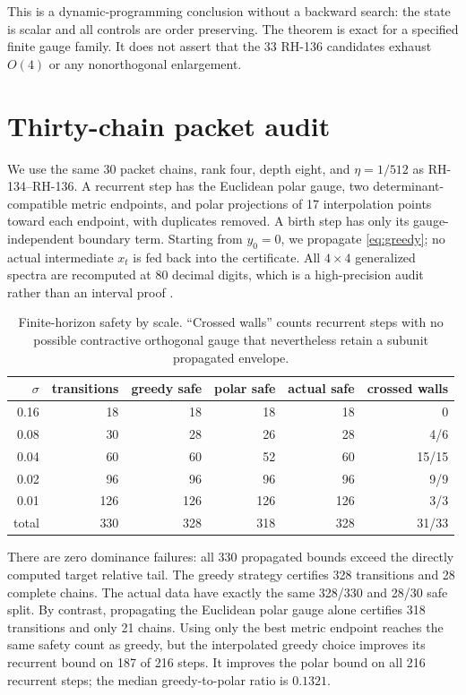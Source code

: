 \documentclass[12pt]{article}
\begin{document}
This is a dynamic-programming conclusion without a backward search: the
state is scalar and all controls are order preserving.  The theorem is exact
for a specified finite gauge family.  It does not assert that the 33 RH-136
candidates exhaust $O(4)$ or any nonorthogonal enlargement.

\section{Thirty-chain packet audit}
We use the same 30 packet chains, rank four, depth eight, and
$\eta=1/512$ as RH-134--RH-136.  A recurrent step has the Euclidean polar
gauge, two determinant-compatible metric endpoints, and polar projections of
17 interpolation points toward each endpoint, with duplicates removed.  A
birth step has only its gauge-independent boundary term.  Starting from
$y_0=0$, we propagate \eqref{eq:greedy}; no actual intermediate $x_t$ is fed
back into the certificate.  All $4\times4$ generalized spectra are
recomputed at 80 decimal digits, which is a high-precision audit rather than
an interval proof \citep{Higham2002}.

\begin{table}[t]
\centering
\begin{tabular}{rrrrrr}
\toprule
$\sigma$ & transitions & greedy safe & polar safe & actual safe & crossed walls \\
\midrule
0.16 & 18  & 18  & 18  & 18  & 0 \\
0.08 & 30  & 28  & 26  & 28  & 4/6 \\
0.04 & 60  & 60  & 52  & 60  & 15/15 \\
0.02 & 96  & 96  & 96  & 96  & 9/9 \\
0.01 & 126 & 126 & 126 & 126 & 3/3 \\
\midrule
total & 330 & 328 & 318 & 328 & 31/33 \\
\bottomrule
\end{tabular}
\caption{Finite-horizon safety by scale.  ``Crossed walls'' counts recurrent
steps with no possible contractive orthogonal gauge that nevertheless retain
a subunit propagated envelope.}
\label{tab:audit}
\end{table}

There are zero dominance failures: all 330 propagated bounds exceed the
directly computed target relative tail.  The greedy strategy certifies 328
transitions and 28 complete chains.  The actual data have exactly the same
328/330 and 28/30 safe split.  By contrast, propagating the Euclidean polar
gauge alone certifies 318 transitions and only 21 chains.  Using only the
best metric endpoint reaches the same safety count as greedy, but the
interpolated greedy choice improves its recurrent bound on 187 of 216 steps.
It improves the polar bound on all 216 recurrent steps; the median
greedy-to-polar ratio is $0.1321$.
\end{document}
